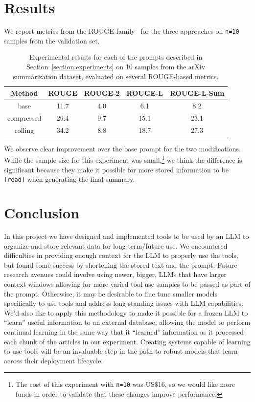 \documentclass{article}
\begin{document}
\section{Results}

We report metrics from the ROUGE family~\cite{lin-hovy-2003-automatic,ganesan2015rouge} for the three approaches on \texttt{n=10} samples from the validation set.

\begin{table}[!ht]
  \centering
  \begin{tabular}{c|c|c|c|c}
    \textbf{Method} & \textbf{ROUGE} & \textbf{ROUGE-2} & \textbf{ROUGE-L} & \textbf{ROUGE-L-Sum} \\
    \hline
    base            & 11.7           & 4.0              & 6.1              & 8.2                  \\
    compressed      & 29.4           & 9.7              & 15.1             & 23.1                 \\
    rolling         & 34.2           & 8.8              & 18.7             & 27.3                 \\
  \end{tabular}
  \vspace{0.5cm}
  \caption{Experimental results for each of the prompts described in Section~\ref{section:experiments} on 10 samples from the arXiv summarization dataset, evaluated on several ROUGE-based metrics.}\label{tab:results}
\end{table}

We observe clear improvement over the base prompt for the two modifications. While the sample size for this experiment was small,\footnote{The cost of this experiment with \texttt{n=10} was US\$16, so we would like more funds in order to validate that these changes improve performance.} we think the difference is significant because they make it possible for more stored information to be \texttt{[read]} when generating the final summary.


\section{Conclusion}

In this project we have designed and implemented tools to be used by an LLM to organize and store relevant data for long-term/future use.
We encountered difficulties in providing enough context for the LLM to properly use the tools, but found some success by shortening the stored text and the prompt.
Future research avenues could involve using newer, bigger, LLMs that have larger context windows allowing for more varied tool use samples to be passed as part of the prompt.
Otherwise, it may be desirable to fine tune smaller models specifically to use tools and address long standing issues with LLM capabilities.
We'd also like to apply this methodology to make it possible for a frozen LLM to ``learn'' useful information to an external database, allowing the model to perform continual learning in the same way that it ``learned'' information as it processed each chunk of the articles in our experiment.
Creating systems capable of learning to use tools will be an invaluable step in the path to robust models that learn across their deployment lifecycle.
\end{document}
